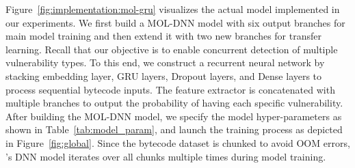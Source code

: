 Figure~\ref{fig:implementation:mol-gru} visualizes the actual model implemented in our experiments. We first build a MOL-DNN model with six output branches for main model training and then extend it with two new branches for transfer learning.
Recall that our objective is to enable concurrent detection of multiple vulnerability types. To this end, we construct a recurrent neural network by stacking embedding layer, GRU layers, Dropout layers, and Dense layers to process sequential bytecode inputs. 
The feature extractor is concatenated with multiple branches to output the probability of having each specific vulnerability.  
After building the MOL-DNN model, we specify the model hyper-parameters as shown in Table~\ref{tab:model_param}, and launch the training process as depicted in Figure~\ref{fig:global}.
Since the bytecode dataset is chunked to avoid OOM errors, \sys{}'s DNN model iterates over all chunks multiple times during model training. 

\begin{table}[ht!]
\centering
{}
\vspace{1.6em}
\caption{Model Hyper-parameters.}
\label{tab:model_param}
\vspace{-1.6em}
\end{table}

